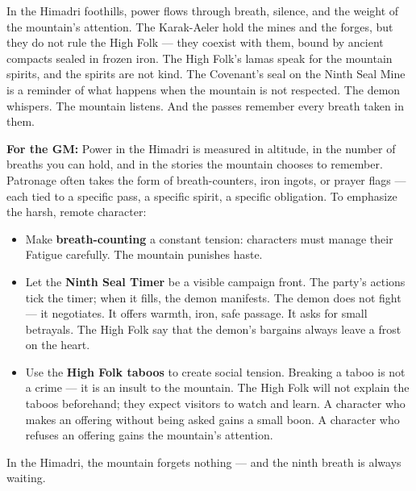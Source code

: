 \begin{tcolorbox}[colback=black!3,colframe=black!40!white,title={Patronage \& Power},breakable]
In the Himadri foothills, power flows through breath, silence, and the weight of the mountain's attention. The Karak-Aeler hold the mines and the forges, but they do not rule the High Folk --- they coexist with them, bound by ancient compacts sealed in frozen iron. The High Folk's lamas speak for the mountain spirits, and the spirits are not kind. The Covenant's seal on the Ninth Seal Mine is a reminder of what happens when the mountain is not respected. The demon whispers. The mountain listens. And the passes remember every breath taken in them.

\textbf{For the GM:}  
Power in the Himadri is measured in altitude, in the number of breaths you can hold, and in the stories the mountain chooses to remember. Patronage often takes the form of breath-counters, iron ingots, or prayer flags --- each tied to a specific pass, a specific spirit, a specific obligation. To emphasize the harsh, remote character:
\begin{itemize}
\item Make \textbf{breath-counting} a constant tension: characters must manage their Fatigue carefully. The mountain punishes haste.
\item Let the \textbf{Ninth Seal Timer } be a visible campaign front. The party's actions tick the timer; when it fills, the demon manifests. The demon does not fight --- it negotiates. It offers warmth, iron, safe passage. It asks for small betrayals. The High Folk say that the demon's bargains always leave a frost on the heart.
\item Use the \textbf{High Folk taboos} to create social tension. Breaking a taboo is not a crime --- it is an insult to the mountain. The High Folk will not explain the taboos beforehand; they expect visitors to watch and learn. A character who makes an offering without being asked gains a small boon. A character who refuses an offering gains the mountain's attention.
\end{itemize}
In the Himadri, the mountain forgets nothing --- and the ninth breath is always waiting.
\end{tcolorbox}

